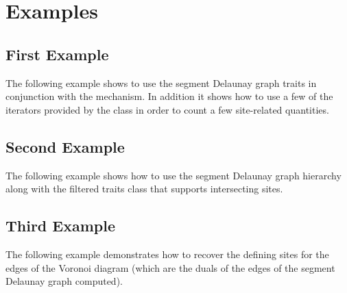 
\section{Examples}
\label{sec:sdg2-examples}

\subsection{First Example}

The following example shows to use the segment Delaunay graph traits
in conjunction with the  mechanism. In
addition it shows how to use a few of the iterators provided by the
 class in order to count a few
site-related quantities.


\subsection{Second Example}

The following example shows how to use the segment Delaunay graph
hierarchy along with the filtered traits class that supports
intersecting sites.


\subsection{Third Example}

The following example demonstrates how to recover the defining sites
for the edges of the Voronoi diagram (which are the duals of the
edges of the segment Delaunay graph computed).



